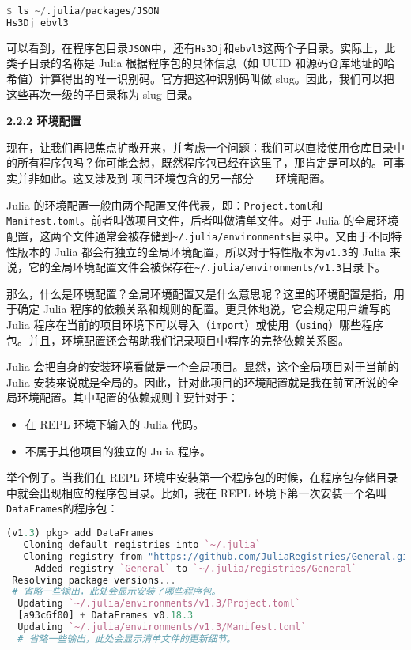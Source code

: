\begin{lstlisting}[language=julia]
$ ls ~/.julia/packages/JSON
Hs3Dj ebvl3
\end{lstlisting}

可以看到，在程序包目录\verb|JSON|中，还有\verb|Hs3Dj|和\verb|ebvl3|这两个子目录。实际上，此类子目录的名称是 Julia 根据程序包的具体信息（如 UUID 和源码仓库地址的哈希值）计算得出的唯一识别码。官方把这种识别码叫做 slug。因此，我们可以把这些再次一级的子目录称为 slug 目录。

\textbf{2.2.2 环境配置}

现在，让我们再把焦点扩散开来，并考虑一个问题：我们可以直接使用仓库目录中的所有程序包吗？你可能会想，既然程序包已经在这里了，那肯定是可以的。可事实并非如此。这又涉及到 项目环境包含的另一部分——环境配置。

Julia 的环境配置一般由两个配置文件代表，即：\verb|Project.toml|和\verb|Manifest.toml|。前者叫做项目文件，后者叫做清单文件。对于 Julia 的全局环境配置，这两个文件通常会被存储到\verb|~/.julia/environments|目录中。又由于不同特性版本的 Julia 都会有独立的全局环境配置，所以对于特性版本为\verb|v1.3|的 Julia 来说，它的全局环境配置文件会被保存在\verb|~/.julia/environments/v1.3|目录下。

那么，什么是环境配置？全局环境配置又是什么意思呢？这里的环境配置是指，用于确定 Julia 程序的依赖关系和规则的配置。更具体地说，它会规定用户编写的 Julia 程序在当前的项目环境下可以导入（\verb|import|）或使用（\verb|using|）哪些程序包。并且，环境配置还会帮助我们记录项目中程序的完整依赖关系图。

Julia 会把自身的安装环境看做是一个全局项目。显然，这个全局项目对于当前的 Julia 安装来说就是全局的。因此，针对此项目的环境配置就是我在前面所说的全局环境配置。其中配置的依赖规则主要针对于：

\begin{itemize}
\item 在 REPL 环境下输入的 Julia 代码。
\item 不属于其他项目的独立的 Julia 程序。
\end{itemize}

举个例子。当我们在 REPL 环境中安装第一个程序包的时候，在程序包存储目录中就会出现相应的程序包目录。比如，我在 REPL 环境下第一次安装一个名叫\verb|DataFrames|的程序包：

\begin{lstlisting}[language=julia]
(v1.3) pkg> add DataFrames
   Cloning default registries into `~/.julia`
   Cloning registry from "https://github.com/JuliaRegistries/General.git"
     Added registry `General` to `~/.julia/registries/General`
 Resolving package versions...
 # 省略一些输出，此处会显示安装了哪些程序包。
  Updating `~/.julia/environments/v1.3/Project.toml`
  [a93c6f00] + DataFrames v0.18.3
  Updating `~/.julia/environments/v1.3/Manifest.toml`
  # 省略一些输出，此处会显示清单文件的更新细节。
\end{lstlisting}

